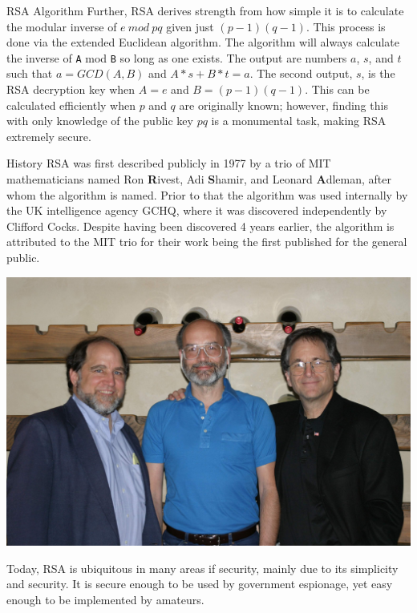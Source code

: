 \documentclass[landscape,a0paper,fontscale=.46]{baposter} %
\begin{document}
\begin{poster}
\begin{posterbox}[name=rsa,column=1,row=0]{RSA Algorithm}
Further, RSA derives strength from how simple it is to calculate the modular inverse of $e\ mod\ pq$ given just $(p-1)(q-1)$. This process is done via the extended Euclidean algorithm. The algorithm will always calculate the inverse of \verb|A| mod \verb|B| so long as one exists. The output are numbers $a$, $s$, and $t$ such that $a = GCD(A,B)$ and $A*s + B*t = a$. The second output, $s$, is the RSA decryption key when $A=e$ and ${B=(p-1)(q-1)}$. This can be calculated efficiently when $p$ and $q$ are originally known; however, finding this with only knowledge of the public key $pq$ is a monumental task, making RSA extremely secure.  
\end{posterbox}


\begin{posterbox}[name=history, column=1, below=rsa]{History}
RSA was first described publicly in 1977 by a trio of MIT mathematicians named Ron \textbf{R}ivest, Adi \textbf{S}hamir, and Leonard \textbf{A}dleman, after whom the algorithm is named. Prior to that the algorithm was used internally by the UK intelligence agency GCHQ, where it was discovered independently by Clifford Cocks. Despite having been discovered 4 years earlier, the algorithm is attributed to the MIT trio for their work being the first published for the general public.

\begin{center}
\includegraphics[width=0.8\linewidth]{RSA-2003.jpg}
\end{center}


Today, RSA is ubiquitous in many areas if security, mainly due to its simplicity and security. It is secure enough to be used by government espionage, yet easy enough to be implemented by amateurs. 
\end{posterbox}

\end{poster}
\end{document}
